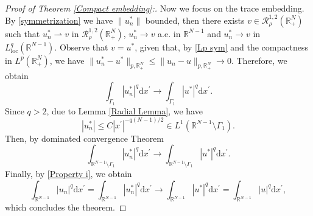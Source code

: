 \documentclass[12pt,reqno]{amsart}
\begin{document}
\begin{proof}[Proof of Theorem \ref{Compact embedding}:]
Now we focus on the trace embedding. By \eqref{symmetrization} we have $\|u_n^\ast\|$ bounded, then there exists $v\in \mathcal{R}^{1,2}_\rho(\mathds{R}^N_+)$ such that $u_n^\ast \rightharpoonup v$ in $\mathcal{R}^{1,2}_\rho(\mathds{R}^N_+)$, $u_n^\ast \longrightarrow v$ a.e. in $\mathds{R}^{N-1}$ and $u_n^\ast\longrightarrow v$ in $L^q_{\mathrm{loc}}(\mathds{R}^{N-1})$. Observe that $v=u^\ast$, given that, by \eqref{Lp sym} and the compactness in $L^p(\mathds{R}^N_+)$, we have $\|u_n^\ast-u^\ast\|_{p,\mathds{R}^N_+}\leq \|u_n-u\|_{p,\mathds{R}^N_+}\longrightarrow 0$. Therefore, we obtain
\begin{equation*}
    \int_{\Gamma_1}|u_n^\ast|^q\mathrm{d}x^\prime\longrightarrow \int_{\Gamma_1}|u^\ast|^q\mathrm{d}x^\prime.
\end{equation*}
Since $q>2$, due to Lemma \ref{Radial Lemma}, we have
\begin{equation*}
    |u_n^\ast|\leq C|x^\prime|^{-q(N-1)/2}\in L^1(\mathds{R}^{N-1}\setminus \Gamma_1).
\end{equation*}
Then,  by dominated convergence Theorem 
\begin{equation*}
    \int_{\mathds{R}^{N-1}\setminus\Gamma_1}|u_n^\ast|^q\mathrm{d}x^\prime\longrightarrow \int_{\mathds{R}^{N-1}\setminus\Gamma_1}|u^\ast|^q\mathrm{d}x^\prime.
\end{equation*}
Finally, by \eqref{Property i}, we obtain
\begin{equation*}
    \int_{\mathds{R}^{N-1}}|u_n|^q\mathrm{d}x^\prime=\int_{\mathds{R}^{N-1}}|u_n^\ast|^q\mathrm{d}x^\prime\longrightarrow \int_{\mathds{R}^{N-1}}|u^\ast|^q\mathrm{d}x^\prime=\int_{\mathds{R}^{N-1}}|u|^q\mathrm{d}x^\prime,
\end{equation*}
which concludes the theorem.
\end{proof}
\end{document}
